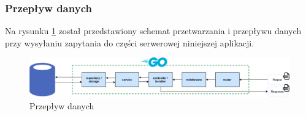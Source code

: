 % 
\subsubsection{Przepływ danych}
Na rysunku \ref{fig:backend_data_flow} został przedstawiony schemat przetwarzania i przepływu danych przy wysyłaniu zapytania do części serwerowej niniejszej aplikacji.
\begin{figure}[ht]
\centering
\includegraphics[width=0.9\linewidth]{rys03/backend_data_flow.png}
\caption{Przepływ danych}
\label{fig:backend_data_flow}
\end{figure}

% 
